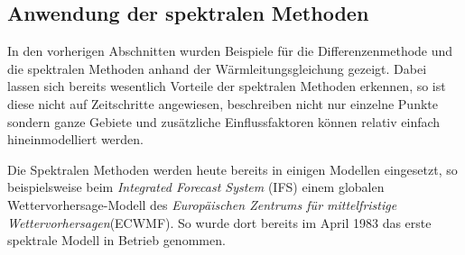 \begin{refsection}
\subsection{Anwendung der spektralen Methoden}
In den vorherigen Abschnitten wurden Beispiele für die Differenzenmethode und die spektralen Methoden anhand der Wärmleitungsgleichung gezeigt. Dabei lassen sich bereits wesentlich Vorteile der spektralen Methoden erkennen, so ist diese nicht auf Zeitschritte angewiesen, beschreiben nicht nur einzelne Punkte sondern ganze Gebiete und zusätzliche Einflussfaktoren können relativ einfach hineinmodelliert werden.
 
Die Spektralen Methoden werden heute bereits in einigen Modellen eingesetzt, so beispielsweise beim \textit{Integrated Forecast System} (IFS) einem globalen Wettervorhersage-Modell des \textit{Europäischen Zentrums für mittelfristige Wettervorhersagen}(ECWMF). So wurde dort bereits im April 1983 das erste spektrale Modell in Betrieb genommen.\cite{klima:ecmwf}


\printbibliography[heading=subbibliography]
\end{refsection}
